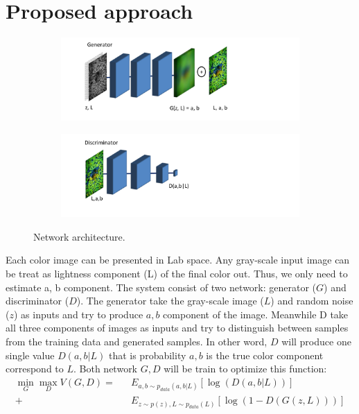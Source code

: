 \documentclass[10pt,twocolumn,letterpaper]{article}
\begin{document}
\section{Proposed approach}


\begin{figure} [t!]
    \centering
    \begin{subfigure}[b]{0.48\textwidth}        
        \includegraphics[trim=30 20 150 0, clip,width=\textwidth]{img/Generator.pdf}
    \end{subfigure}
    \begin{subfigure}[b]{0.48\textwidth}
        \includegraphics[trim=30 20 150 0, clip,width=\textwidth]{img/Discriminator.pdf}
    \end{subfigure}
    \vspace{-0.16in}
    \caption{\small Network architecture.}
    \vspace{-0.2in}
   \label{fig:dataPartition}
\end{figure}

Each color image can be presented in Lab space. Any gray-scale input image can be treat as lightness component (L) of the final color out. Thus, we only need to estimate a, b component. The system consist of two network: generator ($G$) and discriminator ($D$). The generator take the gray-scale image ($L$) and random noise ($z$) as inputs and try to produce $a, b$ component of the image. Meanwhile D take all three components of images as inputs and try to distinguish between samples from the training data and generated samples. In other word, $D$ will produce one single value $D(a,b|L)$ that is probability $a, b$ is the true color component correspond to $L$. Both network $G, D$ will be train to optimize this function:
\begin{eqnarray*}
 \min_{G} \max_{D} V(G,D) = &&E_{a, b \sim p_{data}(a,b | L)} [\log(D(a,b|L))] \\ 
                          + &&E_{z \sim p(z), L \sim p_{data}(L) } [\log(1-D(G(z,L)))]
\end{eqnarray*}
\end{document}
